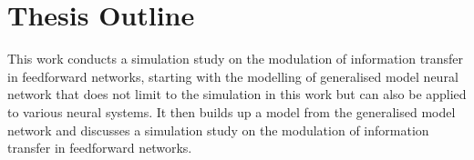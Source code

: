 \section{Thesis Outline}
This work conducts a simulation study on the modulation of information transfer in feedforward networks, starting with the modelling of generalised model neural network that does not limit to the simulation in this work but can also be applied to various neural systems. It then builds up a model from the generalised model network and discusses a simulation study on the modulation of information transfer in feedforward networks. 






%
%
%
%
%
%
%
%
%
%
